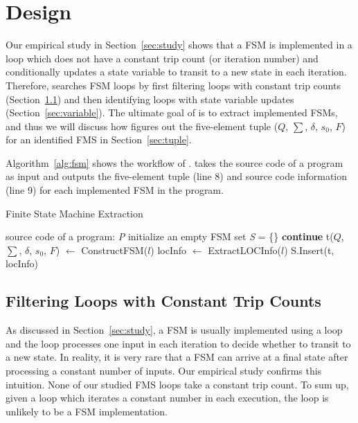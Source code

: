 \section{\Tool{} Design}
\label{sec:impl}

Our empirical study in Section~\ref{sec:study} 
shows that a FSM is implemented in a loop 
which does not have a constant trip count (or iteration number) 
and conditionally updates a state variable 
to transit to a new state in each iteration. 
Therefore, \Tool{} searches FSM loops
by first filtering loops with constant trip counts (Section~\ref{sec:constant}) 
and then identifying loops with state variable updates (Section~\ref{sec:variable}).
The ultimate goal of \Tool{} is to extract implemented FSMs, 
and thus we will discuss how \Tool{} figures out the five-element tuple 
($Q$, $\sum$, $\delta$, $s_0$, $F$) 
for an identified FMS in Section~\ref{sec:tuple}. 

Algorithm~\ref{alg:fsm} shows the workflow of \Tool{}.
\Tool{} takes the source code of a program as input
and outputs the five-element tuple (line 8) 
and source code information (line 9) for each 
implemented FSM in the program.  


\begin{algorithm}[!htb]
    \caption{Finite State Machine Extraction}
    \label{alg:fsm}
    \begin{algorithmic}[1]
        \Require source code of a program: \emph{P}
        \State initialize an empty FSM set \emph{S} = \{\}
        		\State \textbf{continue}
        	\EndIf
        			\State t($Q$, $\sum$, $\delta$, $s_0$, $F$) $\gets$ ConstructFSM($l$)
        			\State locInfo $\gets$ ExtractLOCInfo($l$) 
        			\State S.Insert(t, locInfo)
        	\EndIf
        \EndFor
        \State {}
        \EndFunction
    \end{algorithmic}
\end{algorithm}


\subsection{Filtering Loops with Constant Trip Counts}
\label{sec:constant}
As discussed in Section~\ref{sec:study},
a FSM is usually implemented using a loop 
and the loop processes one input in each iteration to decide 
whether to transit to a new state. 
In reality, it is very rare that a FSM can arrive at a final state 
after processing a constant number of inputs.
Our empirical study confirms this intuition. 
None of our studied FMS loops take a constant trip count.  
To sum up, given a loop which iterates a constant 
number in each execution, 
the loop is unlikely to be a FSM implementation. 

